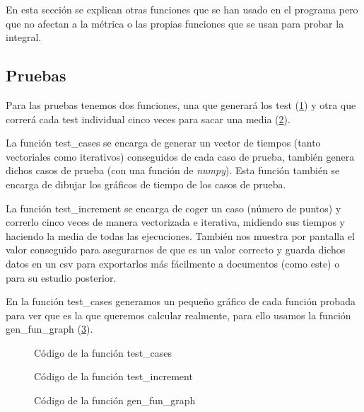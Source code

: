 \documentclass[6pt]{AiTex}
\begin{document}
En esta sección se explican otras funciones que se han usado en el programa pero que no afectan a la métrica o las propias funciones que se usan para probar la integral.

\subsection{Pruebas}
Para las pruebas tenemos dos funciones, una que generará los test (\ref{fig:test_cases}) y otra que correrá cada test individual cinco veces para sacar una media (\ref{fig:test_increment}).

La función \textcolor{codepurple}{test\_cases} se encarga de generar un vector de tiempos (tanto vectoriales como iterativos) conseguidos de cada caso de prueba, también genera dichos casos de prueba (con una función de \textit{numpy}). Esta función también se encarga de dibujar los gráficos de tiempo de los casos de prueba.

La función \textcolor{codepurple}{test\_increment} se encarga de coger un caso (número de puntos) y correrlo cinco veces de manera vectorizada e iterativa, midiendo sus tiempos y haciendo la media de todas las ejecuciones. También nos muestra por pantalla el valor conseguido para asegurarnos de que es un valor correcto y guarda dichos datos en un csv para exportarlos más fácilmente a documentos (como este) o para su estudio posterior.

En la función \textcolor{codepurple}{test\_cases} generamos un pequeño gráfico de cada función probada para ver que es la que queremos calcular realmente, para ello usamos la función \textcolor{codepurple}{gen\_fun\_graph} (\ref{fig:gen_fun_graph}).

\begin{figure}[H]
    \centering
    
    \caption{Código de la función test\_cases}
    \label{fig:test_cases}
\end{figure}

\begin{figure}[H]
    \centering
    
    \caption{Código de la función test\_increment}
    \label{fig:test_increment}
\end{figure}

\begin{figure}[H]
    \centering
    
    \caption{Código de la función gen\_fun\_graph}
    \label{fig:gen_fun_graph}
\end{figure}
\end{document}
